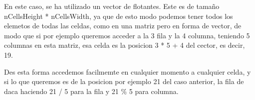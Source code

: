 En este caso, se ha utilizado un vector de flotantes. Este es de tamaño  nCellsHeight * nCellsWidth, ya que de esto modo podemos tener todos los elemetos de todas las celdas, como en una matriz pero en forma de vector, de modo que si por ejemplo queremos acceder a la 3 fila y la 4 columna, teniendo 5 columnas en esta matriz, esa celda es la posicion  3 * 5 + 4 del cector, es decir, 19.

Des esta forma accedemos facilmemte en cualquier momento a cualquier celda, y si lo que queremos es de la posicion por ejemplo 21 del caso anterior, la fila de daca haciendo 21 / 5 para la fila y 21 \% 5 para columna.